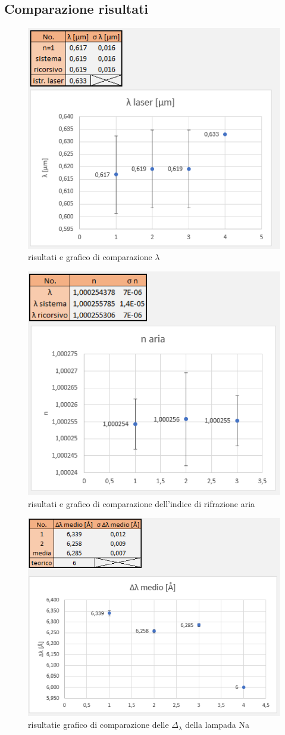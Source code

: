 \documentclass{article}
\begin{document}
\subsection{Comparazione risultati}

\begin{figure}[h!]
  \centering
  \includegraphics[width=0.6\linewidth]{IM comparazione lambda}
  \caption{risultati e grafico di comparazione $\lambda$}
\end{figure}

\begin{figure}[h!]
  \centering
  \includegraphics[width=0.6\linewidth]{IM comparazione n}
  \caption{risultati e grafico di comparazione dell'indice di rifrazione aria}
\end{figure}

\begin{figure}[h!]
  \centering
  \includegraphics[width=0.6\linewidth]{IM comparazione delta lambda}
  \caption{risultatie grafico di comparazione delle $\Delta_\lambda$ della lampada Na}
\end{figure}
\end{document}
